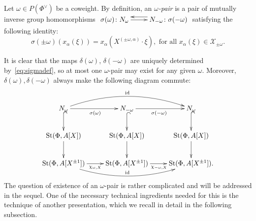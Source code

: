 \begin{dfn} \label{dfn:delta-pair}
Let $\omega \in P(\Phi^\vee)$ be a coweight.
By definition, an {\it $\omega$-pair} is a pair of mutually inverse group homomorphisms
$\xymatrix{ \sigma(\omega)\colon N_\omega \ar[r] & \ar@<-1.0ex>[l] N_{-\omega}\colon \sigma(-\omega) }$ satisfying the following identity:
\begin{equation} \label{eq:sigmadef}
\sigma(\pm \omega)(x_\alpha(\xi)) = x_\alpha(X^{(\pm \omega, \alpha)}\cdot \xi),
\text{ for all } x_\alpha(\xi) \in \mathcal{X}_{\pm\omega}.
\end{equation}\end{dfn}
It is clear that the maps $\delta(\omega)$, $\delta(-\omega)$ are uniquely determined by~\eqref{eq:sigmadef}, so at most one $\omega$-pair may exist for any given $\omega$.
Moreover, $\delta(\omega), \delta(-\omega)$ always make the following diagram commute:
\begin{equation} \label{eq:sigma-diagram}
\xymatrix{ N_\omega \ar[r]_{\sigma(\omega)}\ar@{^{(}->}[d] \ar@/^1.5pc/[rr]^{\mathrm{id}} & N_{-\omega} \ar@{^{(}->}[d] \ar[r]_{\sigma(-\omega)} & N_\omega \ar@{^{(}->}[d] \\
\St(\Phi, A[X]) \ar[d] & \St(\Phi, A[X]) \ar[d] & \St(\Phi, A[X]) \ar[d] \\
\St(\Phi, A[X^{\pm 1}]) \ar@<-0.0ex>[r]_{\chi_{\omega, X}} \ar@/_1.5pc/[rr]^{\mathrm{id}} & \St(\Phi, A[X^{\pm 1}]) \ar@<-0.0ex>[r]_{\chi_{-\omega, X}} & \St(\Phi, A[X^{\pm 1}]).} \end{equation}
The question of existence of an $\omega$-pair is rather complicated and will be addressed in the sequel.
One of the necessary technical ingredients needed for this is the technique of another presentation, which we recall in detail in the following subsection.

